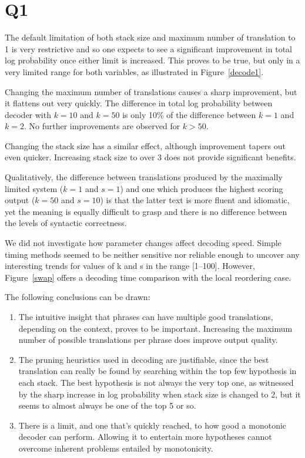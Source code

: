 \section*{Q1}
The default limitation of both stack size and maximum number of translation
to 1 is very restrictive and so one expects to see a significant improvement
in total log probability once either limit is increased. This proves to be
true, but only in a very limited range for both variables, as illustrated in
Figure~\ref{decode1}.
\vspace{4mm} %

Changing the maximum number of translations causes a sharp improvement, but
it flattens out very quickly. The difference in total log probability
between decoder with $k=10$ and $k=50$ is only 10\% of the difference
between $k=1$ and $k=2$. No further improvements are observed for $k>50$.

Changing the stack size has a similar effect, although improvement tapers
out even quicker. Increasing stack size to over 3 does not provide
significant benefits.

Qualitatively, the difference between translations produced by the maximally
limited system ($k=1$ and $s=1$) and one which produces the highest scoring
output ($k=50$ and $s=10$) is that the latter text is more fluent and
idiomatic, yet the meaning is equally difficult to grasp and there is no
difference between the levels of syntactic correctness.

We did not investigate how parameter changes affect decoding speed. Simple
timing methods seemed to be neither sensitive nor reliable enough to uncover
any interesting trends for values of k and s in the range [1--100]. However,
Figure~\ref{swap} offers a decoding time comparison with the local reordering case. 
\vspace{4mm} %

The following conclusions can be drawn:
\begin{enumerate}
	\item
    The intuitive insight that phrases can have multiple good translations,
    depending on the context, proves to be important. Increasing the maximum
    number of possible translations per phrase does improve output quality.
	\item
    The pruning heuristics used in decoding are justifiable, since the best
    translation can really be found by searching within the top few
    hypothesis in each stack. The best hypothesis is not always the very top
    one, as witnessed by the sharp increase in log probability when stack
    size is changed to 2, but it seems to almost always be one of the top 5
    or so.
	\item
    There is a limit, and one that's quickly reached, to how good a
    monotonic decoder can perform. Allowing it to entertain more hypotheses
    cannot overcome inherent problems entailed by monotonicity.
\end{enumerate}


